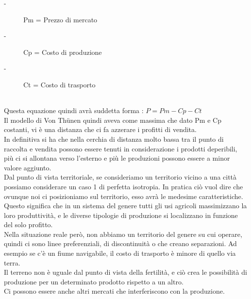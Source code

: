 \documentclass[a4paper,12pt, oneside]{book}
\begin{document}
  \begin{description}
  	\item [-] Pm = Prezzo di mercato
  	\item [-] Cp = Costo di produzione
  	\item [-] Ct = Costo di trasporto
  \end{description}
  \leavevmode\\ 
  Questa equazione quindi avrà suddetta forma : $P = Pm - Cp - Ct$\\
  Il modello di Von Thünen quindi aveva come massima che dato Pm e Cp costanti, vi è una distanza che ci fa azzerare i profitti di vendita.\\
  In definitiva si ha che nella cerchia di distanza molto bassa tra il punto di raccolta e vendita possono essere tenuti in considerazione i prodotti deperibili, più ci si allontana verso l'esterno e più le produzioni possono essere a minor valore aggiunto.\\
  Dal punto di vista territoriale, se consideriamo un territorio vicino a una città possiamo considerare un caso 1 di perfetta isotropia. In pratica ciò vuol dire che ovunque noi ci posizioniamo sul territorio, esso avrà le medesime caratteristiche.\\
  Questo significa che in un sistema del genere tutti gli usi agricoli massimizzano la loro produttività, e le diverse tipologie di produzione si localizzano in funzione del solo profitto.\\
  Nella situazione reale però, non abbiamo un territorio del genere su cui operare, quindi ci sono linee preferenziali, di discontinuità o che creano separazioni. Ad esempio se c'è un fiume navigabile, il costo di trasporto è minore di quello via terra.\\
  Il terreno non è uguale dal punto di vista della fertilità, e ciò crea le possibilità di produzione per un determinato prodotto rispetto a un altro.\\
  Ci possono essere anche altri mercati che interferiscono con la produzione.\\
\end{document}
